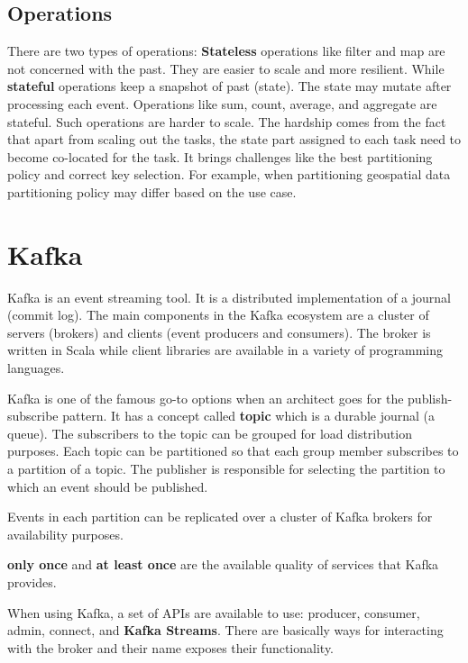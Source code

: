 \documentclass[a4]{report}
\begin{document}
    \subsection{Operations}
    There are two types of operations:
    \textbf{Stateless} operations like filter and map are not concerned with the past.
    They are easier to scale and more resilient.
    While \textbf{stateful} operations keep a snapshot of past (state).
    The state may mutate after processing each event.
    Operations like sum, count, average, and aggregate are stateful.
    Such operations are harder to scale.
    The hardship comes from the fact that apart from scaling out the tasks, the state part assigned to each task need
    to become co-located for the task.
    It brings challenges like the best partitioning policy and correct key selection.
    For example, when partitioning geospatial data partitioning policy may differ based on the use case.


    \section{Kafka}
    Kafka\cite{kafka} is an event streaming tool.
    It is a distributed implementation of a journal (commit log).
    The main components in the Kafka ecosystem are a cluster of servers (brokers) and clients (event producers and consumers).
    The broker is written in Scala while client libraries are available in a variety of programming languages.

    Kafka is one of the famous go-to options when an architect goes for the publish-subscribe pattern.
    It has a concept called \textbf{topic} which is a durable journal (a queue).
    The subscribers to the topic can be grouped for load distribution purposes.
    Each topic can be partitioned so that each group member subscribes to a partition of a topic.
    The publisher is responsible for selecting the partition to which an event should be published.

    Events in each partition can be replicated over a cluster of Kafka brokers for availability purposes.

    \textbf{only once} and \textbf{at least once} are the available quality of services that Kafka provides.

    When using Kafka, a set of APIs are available to use: producer, consumer, admin, connect, and \textbf{Kafka Streams}.
    There are basically ways for interacting with the broker and their name exposes their functionality.
\end{document}
